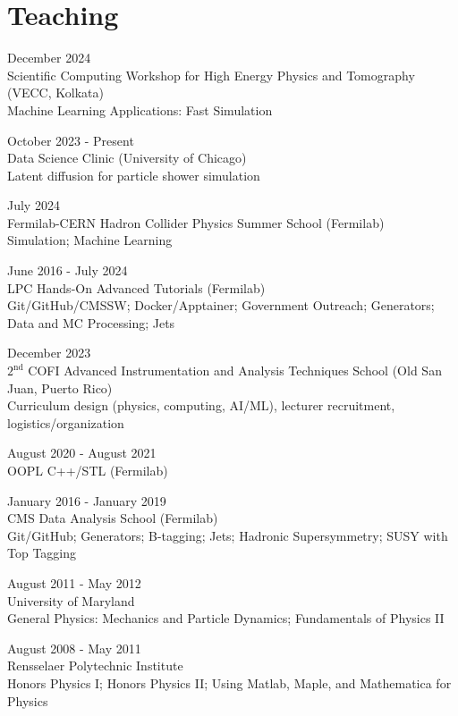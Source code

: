\section{Teaching}
\begin{description}[leftmargin=12pt,font=\normalfont\textit]
\item[Lecturer] \hfill December 2024\\
Scientific Computing Workshop for High Energy Physics and Tomography (VECC, Kolkata)\\
Machine Learning Applications: Fast Simulation
\item[Project Advisor] \hfill October 2023 - Present\\
Data Science Clinic (University of Chicago)\\
Latent diffusion for particle shower simulation
\item[Lecturer] \hfill July 2024\\
Fermilab-CERN Hadron Collider Physics Summer School (Fermilab)\\
Simulation; Machine Learning
\item[Facilitator] \hfill June 2016 - July 2024\\
LPC Hands-On Advanced Tutorials (Fermilab)\\
Git/GitHub/CMSSW; Docker/Apptainer; Government Outreach; Generators; Data and MC Processing; Jets
\item[Co-director] \hfill December 2023\\
$2^{\text{nd}}$ COFI Advanced Instrumentation and Analysis Techniques School (Old San Juan, Puerto Rico)\\
Curriculum design (physics, computing, AI/ML), lecturer recruitment, logistics/organization
\item[Teaching Assistant] \hfill August 2020 - August 2021\\
OOPL C++/STL (Fermilab)
\item[Facilitator] \hfill January 2016 - January 2019\\
CMS Data Analysis School (Fermilab)\\
Git/GitHub; Generators; B-tagging; Jets; Hadronic Supersymmetry; SUSY with Top Tagging
\item[Graduate Teaching Assistant] \hfill August 2011 - May 2012\\
University of Maryland\\
General Physics: Mechanics and Particle Dynamics; Fundamentals of Physics II
\item[Undergraduate Teaching Assistant] \hfill August 2008 - May 2011\\
Rensselaer Polytechnic Institute\\
Honors Physics I; Honors Physics II; Using Matlab, Maple, and Mathematica for Physics
\end{description}